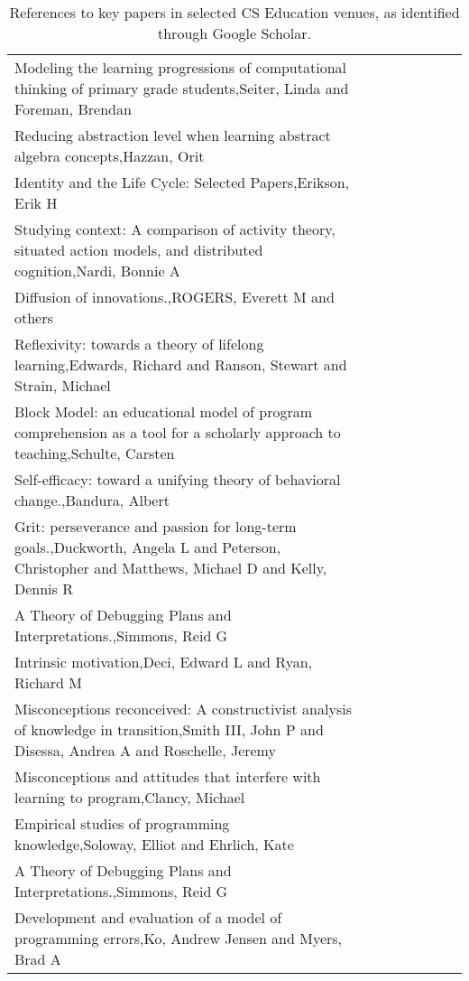 \begin{table*}[t]
\begin{tabular}{lp{2cm}p{2cm}p{2cm}p{2cm}p{2cm}p{2cm}r}
Modeling the learning progressions of computational thinking of primary grade students,Seiter, Linda and Foreman, Brendan &  &  &  &  &  &  & \\
Reducing abstraction level when learning abstract algebra concepts,Hazzan, Orit &  &  &  &  &  &  & \\
Identity and the Life Cycle: Selected Papers,Erikson, Erik H &  &  &  &  &  &  & \\
Studying context: A comparison of activity theory, situated action models, and distributed cognition,Nardi, Bonnie A &  &  &  &  &  &  & \\
Diffusion of innovations.,ROGERS, Everett M and others &  &  &  &  &  &  & \\
Reflexivity: towards a theory of lifelong learning,Edwards, Richard and Ranson, Stewart and Strain, Michael &  &  &  &  &  &  & \\
Block Model: an educational model of program comprehension as a tool for a scholarly approach to teaching,Schulte, Carsten &  &  &  &  &  &  & \\
Self-efficacy: toward a unifying theory of behavioral change.,Bandura, Albert &  &  &  &  &  &  & \\
Grit: perseverance and passion for long-term goals.,Duckworth, Angela L and Peterson, Christopher and Matthews, Michael D and Kelly, Dennis R &  &  &  &  &  &  & \\
A Theory of Debugging Plans and Interpretations.,Simmons, Reid G &  &  &  &  &  &  & \\
Intrinsic motivation,Deci, Edward L and Ryan, Richard M &  &  &  &  &  &  & \\
Misconceptions reconceived: A constructivist analysis of knowledge in transition,Smith III, John P and Disessa, Andrea A and Roschelle, Jeremy &  &  &  &  &  &  & \\
Misconceptions and attitudes that interfere with learning to program,Clancy, Michael &  &  &  &  &  &  & \\
Empirical studies of programming knowledge,Soloway, Elliot and Ehrlich, Kate &  &  &  &  &  &  & \\
A Theory of Debugging Plans and Interpretations.,Simmons, Reid G &  &  &  &  &  &  & \\
Development and evaluation of a model of programming errors,Ko, Andrew Jensen and Myers, Brad A &  &  &  &  &  &  & \\
\end{tabular}
\caption{References to key papers in selected CS Education venues, as identified through Google Scholar.}
\end{table*}